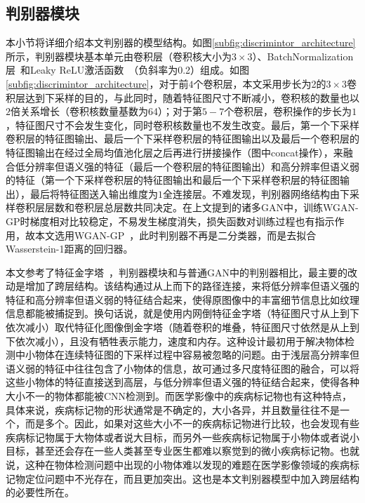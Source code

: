 \subsection{判别器模块}\label{subsec:discrimintor_model}
本小节将详细介绍本文判别器的模型结构。如图\ref{subfig:discrimintor_architecture}所示，判别器模块基本单元由卷积层（卷积核大小为$3\times 3$）、BatchNormalization层~\cite{ioffe2015batch}和Leaky ReLU激活函数~\cite{maas2013rectifier}（负斜率为0.2）组成。如图\ref{subfig:discrimintor_architecture}，对于前$4$个卷积层，本文采用步长为2的$3\times 3$卷积层达到下采样的目的，与此同时，随着特征图尺寸不断减小，卷积核的数量也以$2$倍关系增长（卷积核数量基数为64）；对于第$5-7$个卷积层，卷积操作的步长为$1$，特征图尺寸不会发生变化，同时卷积核数量也不发生改变。最后，第一个下采样卷积层的特征图输出、最后一个下采样卷积层的特征图输出以及最后一个卷积层的特征图输出在经过全局均值池化层之后再进行拼接操作（图中concat操作），来融合低分辨率但语义强的特征（最后一个卷积层的特征图输出）和高分辨率但语义弱的特征（第一个下采样卷积层的特征图输出和最后一个下采样卷积层的特征图输出），最后将特征图送入输出维度为$1$全连接层。不难发现，判别器网络结构由下采样卷积层层数和卷积层总层数共同决定。在上文提到的诸多GAN中，训练WGAN-GP时梯度相对比较稳定，不易发生梯度消失，损失函数对训练过程也有指示作用，故本文选用WGAN-GP~\cite{gulrajani2017improved}，此时判别器不再是二分类器，而是去拟合Wasserstein-1距离的回归器。

本文参考了特征金字塔~\cite{lin2017feature}，判别器模块和与普通GAN中的判别器相比，最主要的改动是增加了跨层结构。该结构通过从上而下的路径连接，来将低分辨率但语义强的特征和高分辨率但语义弱的特征结合起来，使得原图像中的丰富细节信息比如纹理信息都能被捕捉到。换句话说，就是使用内网倒特征金字塔（特征图尺寸从上到下依次减小）取代特征化图像倒金字塔（随着卷积的堆叠，特征图尺寸依然是从上到下依次减小），且没有牺牲表示能力，速度和内存。这种设计最初用于解决物体检测中小物体在连续特征图的下采样过程中容易被忽略的问题。由于浅层高分辨率但语义弱的特征中往往包含了小物体的信息，故可通过多尺度特征图的融合，可以将这些小物体的特征直接送到高层，与低分辨率但语义强的特征结合起来，使得各种大小不一的物体都能被CNN检测到。而医学影像中的疾病标记物也有这种特点，具体来说，疾病标记物的形状通常是不确定的，大小各异，并且数量往往不是一个，而是多个。因此，如果对这些大小不一的疾病标记物进行比较，也会发现有些疾病标记物属于大物体或者说大目标，而另外一些疾病标记物属于小物体或者说小目标，甚至还会存在一些人类甚至专业医生都难以察觉到的微小疾病标记物。也就说，这种在物体检测问题中出现的小物体难以发现的难题在医学影像领域的疾病标记物定位问题中不光存在，而且更加突出。这也是本文判别器模型中加入跨层结构的必要性所在。

